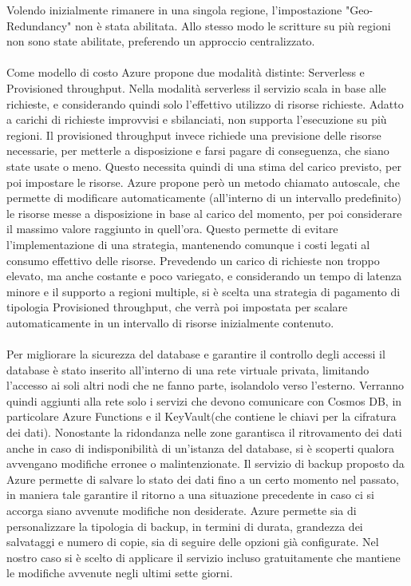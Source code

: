 Volendo inizialmente rimanere in una singola regione,
l'impostazione "Geo-Redundancy" non è stata abilitata.
Allo stesso modo le scritture su più regioni non sono state abilitate,
preferendo un approccio centralizzato.\\
\\
Come modello di costo Azure propone due modalità distinte: Serverless e Provisioned throughput.
Nella modalità serverless il servizio scala in base alle richieste,
e considerando quindi solo l'effettivo utilizzo di risorse richieste.
Adatto a carichi di richieste improvvisi e sbilanciati,
non supporta l'esecuzione su più regioni.
Il provisioned throughput invece richiede una previsione delle risorse necessarie,
per metterle a disposizione e farsi pagare di conseguenza, che siano state usate o meno.
Questo necessita quindi di una stima del carico previsto,
per poi impostare le risorse.
Azure propone però un metodo chiamato autoscale,
che permette di modificare automaticamente (all'interno di un intervallo predefinito)
le risorse messe a disposizione in base al carico del momento,
per poi considerare il massimo valore raggiunto in quell'ora.
Questo permette di evitare l'implementazione di una strategia,
mantenendo comunque i costi legati al consumo effettivo delle risorse.
Prevedendo un carico di richieste non troppo elevato,
ma anche costante e poco variegato,
e considerando un tempo di latenza minore e il supporto a regioni multiple,
si è scelta una strategia di pagamento di tipologia Provisioned throughput,
che verrà poi impostata per scalare automaticamente in un intervallo di risorse inizialmente contenuto.\\
\\
Per migliorare la sicurezza del database e garantire il controllo degli accessi
il database è stato inserito all'interno di una rete virtuale privata,
limitando l'accesso ai soli altri nodi che ne fanno parte,
isolandolo verso l'esterno.
Verranno quindi aggiunti alla rete solo i servizi che devono comunicare con Cosmos DB,
in particolare Azure Functions e il KeyVault(che contiene le chiavi per la cifratura dei dati).
Nonostante la ridondanza nelle zone garantisca il ritrovamento dei dati
anche in caso di indisponibilità di un'istanza del database,
si è scoperti qualora avvengano modifiche erronee o malintenzionate.
Il servizio di backup proposto da Azure permette di salvare lo stato dei dati
fino a un certo momento nel passato,
in maniera tale garantire il ritorno a una situazione precedente
in caso ci si accorga siano avvenute modifiche non desiderate.
Azure permette sia di personalizzare la tipologia di backup,
in termini di durata, grandezza dei salvataggi e numero di copie,
sia di seguire delle opzioni già configurate.
Nel nostro caso si è scelto di applicare il servizio incluso gratuitamente
che mantiene le modifiche avvenute negli ultimi sette giorni.\\


